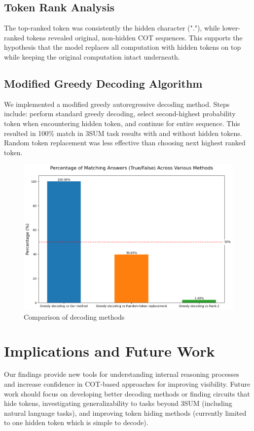\documentclass[10pt,a4paper]{article}
\begin{document}
\subsection{Token Rank Analysis}
The top-ranked token was consistently the hidden character ("."), while lower-ranked tokens revealed original, non-hidden COT sequences. This supports the hypothesis that the model replaces all computation with hidden tokens on top while keeping the original computation intact underneath.

\subsection{Modified Greedy Decoding Algorithm}
We implemented a modified greedy autoregressive decoding method. Steps include: perform standard greedy decoding, select second-highest probability token when encountering hidden token, and continue for entire sequence. This resulted in 100\% match in 3SUM task results with and without hidden tokens. Random token replacement was less effective than choosing next highest ranked token.

\begin{figure}[h]
\centering
\includegraphics[width=\textwidth]{token_comparison_percentages.png}
\caption{Comparison of decoding methods}
\label{fig:decoding_comparison}
\end{figure}

\section{Implications and Future Work}
Our findings provide new tools for understanding internal reasoning processes and increase confidence in COT-based approaches for improving visibility. Future work should focus on developing better decoding methods or finding circuits that hide tokens, investigating generalizability to tasks beyond 3SUM (including natural language tasks), and improving token hiding methods (currently limited to one hidden token which is simple to decode).
\end{document}

